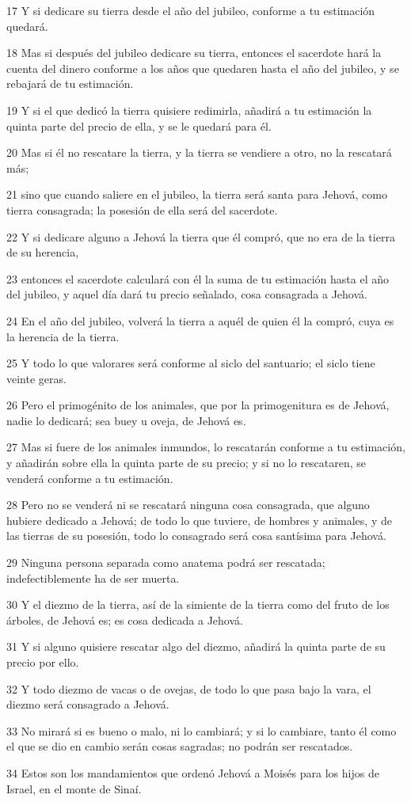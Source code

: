 \par 17 Y si dedicare su tierra desde el año del jubileo, conforme a tu estimación quedará.
\par 18 Mas si después del jubileo dedicare su tierra, entonces el sacerdote hará la cuenta del dinero conforme a los años que quedaren hasta el año del jubileo, y se rebajará de tu estimación.
\par 19 Y si el que dedicó la tierra quisiere redimirla, añadirá a tu estimación la quinta parte del precio de ella, y se le quedará para él.
\par 20 Mas si él no rescatare la tierra, y la tierra se vendiere a otro, no la rescatará más;
\par 21 sino que cuando saliere en el jubileo, la tierra será santa para Jehová, como tierra consagrada; la posesión de ella será del sacerdote.
\par 22 Y si dedicare alguno a Jehová la tierra que él compró, que no era de la tierra de su herencia,
\par 23 entonces el sacerdote calculará con él la suma de tu estimación hasta el año del jubileo, y aquel día dará tu precio señalado, cosa consagrada a Jehová.
\par 24 En el año del jubileo, volverá la tierra a aquél de quien él la compró, cuya es la herencia de la tierra.
\par 25 Y todo lo que valorares será conforme al siclo   del santuario; el siclo tiene veinte geras.
\par 26 Pero el primogénito de los animales, que por la primogenitura es de Jehová, nadie lo dedicará; sea buey u oveja, de Jehová es.
\par 27 Mas si fuere de los animales inmundos, lo rescatarán conforme a tu estimación, y añadirán sobre ella la quinta parte de su precio; y si no lo rescataren, se venderá conforme a tu estimación.
\par 28 Pero no se venderá ni se rescatará ninguna cosa consagrada, que alguno hubiere dedicado a Jehová; de todo lo que tuviere, de hombres y animales, y de las tierras de su posesión, todo lo consagrado será cosa santísima para Jehová.
\par 29 Ninguna persona separada como anatema podrá ser rescatada; indefectiblemente ha de ser muerta.
\par 30 Y el diezmo de la tierra, así de la simiente de la tierra como del fruto de los árboles, de Jehová es; es cosa dedicada a Jehová.
\par 31 Y si alguno quisiere rescatar algo del diezmo, añadirá la quinta parte de su precio por ello.
\par 32 Y todo diezmo de vacas o de ovejas, de todo lo que pasa bajo la vara, el diezmo será consagrado a Jehová.
\par 33 No mirará si es bueno o malo, ni lo cambiará; y si lo cambiare, tanto él como el que se dio en cambio serán cosas sagradas; no podrán ser rescatados.
\par 34 Estos son los mandamientos que ordenó Jehová a Moisés para los hijos de Israel, en el monte de Sinaí.


